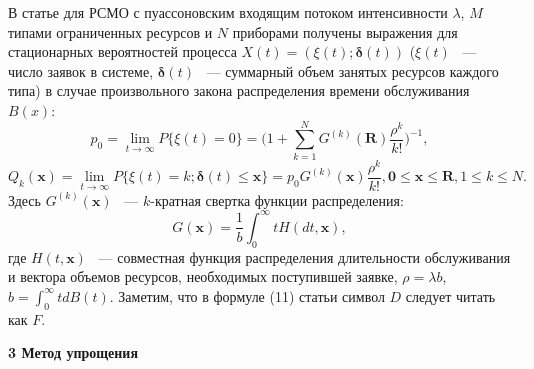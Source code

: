 \documentclass[a4paper,12pt]{article}
\begin{document}
В статье \cite{Naumov_18_2016} для РСМО с пуассоновским входящим потоком интенсивности $\lambda$, $M$ типами ограниченных ресурсов и $N$ приборами получены выражения для стационарных вероятностей процесса $X(t)=(\xi(t);\boldsymbol{\delta}(t))$ ($\xi(t)$ ~--- число заявок в системе, $\boldsymbol{\delta}(t)$ ~--- суммарный объем занятых ресурсов каждого типа)
в случае произвольного закона распределения времени обслуживания $B(x)$:
\begin{equation}
p_0=\lim_{t\rightarrow \infty}P\{\xi(t)=0\}=\bigg(1+\sum_{k=1}^{N}
G^{(k)}(\mathbf{R})\frac{\rho^{k}}{k!} \bigg ) ^{-1},
\end{equation}
\begin{equation}
Q_k(\mathbf{x})=\lim_{t\rightarrow \infty}P\{ \xi(t)=k; \boldsymbol{\delta}(t)\leq \mathbf{x}\}=p_0G^{(k)}(\mathbf{x}) \frac{\rho^{k}}{k!}, \mathbf{0}\leq \mathbf{x} \leq \mathbf{R}, 1\leq k \leq N.
\end{equation}
Здесь $G^{(k)}(\mathbf{x})$ ~--- $k$-кратная свертка функции распределения:
\begin{equation}
G(\mathbf{x})=\frac{1}{b}\int_{0}^{\infty}tH(dt,\mathbf{x}),
\end{equation}
где $H(t,\mathbf{x})$ ~--- совместная функция распределения длительности обслуживания и вектора объемов ресурсов, необходимых поступившей заявке, $\rho=\lambda b$, $b=\int_{0}^{\infty}tdB(t)$.
Заметим, что в формуле (11) статьи \cite{Naumov_18_2016} символ $D$ следует читать как $F$.

\vspace{\baselineskip}     %

\noindent
\textbf{3 Метод упрощения}
\end{document}
